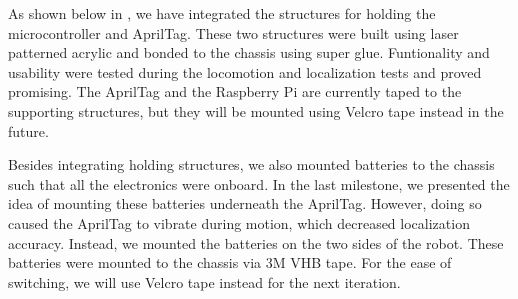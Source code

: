 As shown below in , we have integrated the structures for holding the microcontroller and AprilTag. These two structures were built using laser patterned acrylic and bonded to the chassis using super glue. Funtionality and usability were tested during the locomotion and localization tests and proved promising. The AprilTag and the Raspberry Pi are currently taped to the supporting structures, but they will be mounted using Velcro tape instead in the future. 

Besides integrating holding structures, we also mounted batteries to the chassis such that all the electronics were onboard. In the last milestone, we presented the idea of mounting these batteries underneath the AprilTag. However, doing so caused the AprilTag to vibrate during motion, which decreased localization accuracy.  Instead, we mounted the batteries on the two sides of the robot. These batteries were mounted to the chassis via 3M VHB tape. For the ease of switching, we will use Velcro tape instead for the next iteration. 

